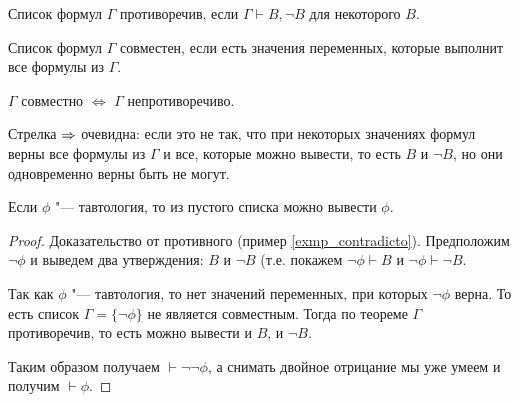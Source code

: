 \begin{Def}
	Список формул $\Gamma$ противоречив, если $\Gamma \vdash B, \lnot B$ для некоторого $B$.
\end{Def}

\begin{Def}
	Список формул $\Gamma$ совместен, если есть значения переменных, которые выполнит все формулы из $\Gamma$.
\end{Def}

\begin{theorem}\label{correct_full_strong}
	$\Gamma$ совместно $\iff$ $\Gamma$ непротиворечиво.
\end{theorem}
\begin{Rem}
	Стрелка $\Rightarrow$ очевидна: если это не так, что при некоторых значениях формул верны все формулы из $\Gamma$ и все, которые можно вывести,
	то есть $B$ и $\lnot B$, но они одновременно верны быть не могут.
\end{Rem}
\begin{conseq}
	Если $\phi$ "--- тавтология, то из пустого списка можно вывести $\phi$.
\end{conseq}
\begin{proof}
	Доказательство от противного (пример \ref{exmp_contradicto}).
	Предположим $\lnot \phi$ и выведем два утверждения: $B$ и $\lnot B$ (т.е. покажем $\lnot \phi \vdash B$ и $\lnot \phi \vdash \lnot B$.

	Так как $\phi$ "--- тавтология, то нет значений переменных, при которых $\lnot \phi$ верна.
	То есть список $\Gamma=\{ \lnot \phi \}$ не является совместным.
	Тогда по теореме $\Gamma$ противоречив, то есть можно вывести и $B$, и $\lnot B$.

	Таким образом получаем $\vdash \lnot \lnot \phi$, а снимать двойное отрицание мы уже умеем и получим $\vdash \phi$.
\end{proof}
